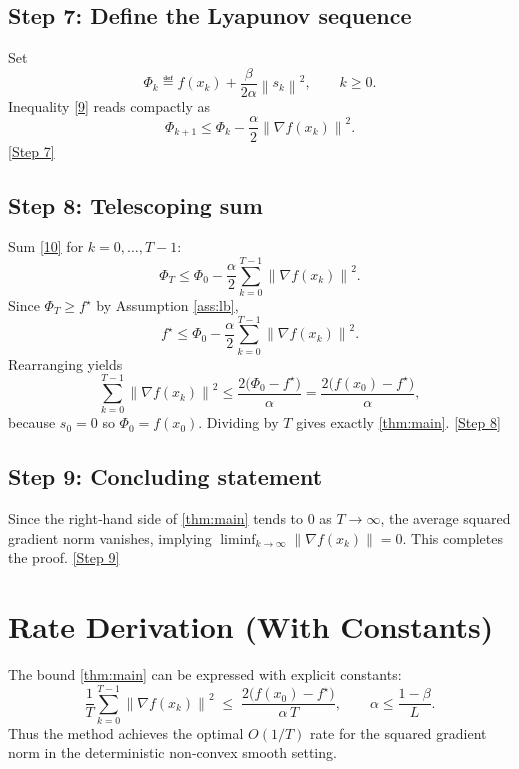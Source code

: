 \documentclass{article}
\newcommand{\norm}[1]{\left\lVert#1\right\rVert}
\begin{document}
\subsection*{Step 7: Define the Lyapunov sequence}
Set
\[
\Phi_{k}\eqdef f(x_{k})+\frac{\beta}{2\alpha}\norm{s_{k}}^{2},\qquad k\ge0 .
\]
Inequality \eqref{9} reads compactly as
\begin{equation}
\Phi_{k+1}\le \Phi_{k}-\frac{\alpha}{2}\norm{\nabla f(x_{k})}^{2}. \tag{10}
\end{equation}
\underline{[Step 7]}

\subsection*{Step 8: Telescoping sum}
Sum \eqref{10} for $k=0,\dots,T-1$:
\[
\Phi_{T}\le \Phi_{0}-\frac{\alpha}{2}\sum_{k=0}^{T-1}\norm{\nabla f(x_{k})}^{2}.
\]
Since $\Phi_{T}\ge f^{\star}$ by Assumption \ref{ass:lb},
\[
f^{\star}\le \Phi_{0}-\frac{\alpha}{2}\sum_{k=0}^{T-1}\norm{\nabla f(x_{k})}^{2}.
\]
Rearranging yields
\[
\sum_{k=0}^{T-1}\norm{\nabla f(x_{k})}^{2}
\le \frac{2\bigl(\Phi_{0}-f^{\star}\bigr)}{\alpha}
= \frac{2\bigl(f(x_{0})-f^{\star}\bigr)}{\alpha},
\]
because $s_{0}=0$ so $\Phi_{0}=f(x_{0})$.  Dividing by $T$ gives exactly \eqref{thm:main}.
\underline{[Step 8]}

\subsection*{Step 9: Concluding statement}
Since the right‑hand side of \eqref{thm:main} tends to $0$ as $T\to\infty$, the average squared gradient norm vanishes, implying $\liminf_{k\to\infty}\norm{\nabla f(x_{k})}=0$.  This completes the proof.
\underline{[Step 9]}

\section*{Rate Derivation (With Constants)}
The bound \eqref{thm:main} can be expressed with explicit constants:
\[
\boxed{
\frac{1}{T}\sum_{k=0}^{T-1}\norm{\nabla f(x_{k})}^{2}
\;\le\;
\frac{2\bigl(f(x_{0})-f^{\star}\bigr)}{\alpha\,T},
\qquad
\alpha\le\frac{1-\beta}{L}.
}
\]
Thus the method achieves the optimal $O(1/T)$ rate for the squared gradient norm in the deterministic non‑convex smooth setting.
\end{document}
